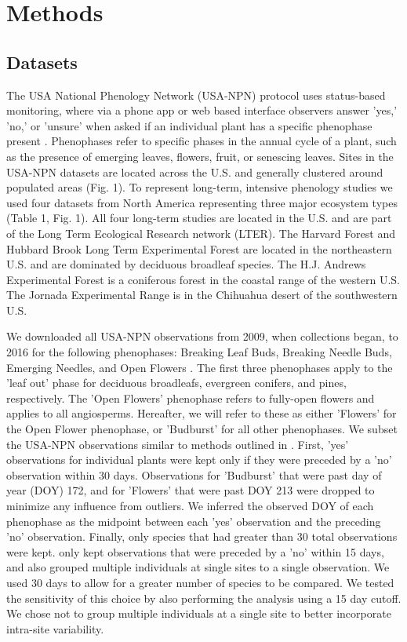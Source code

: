 \documentclass[fleqn,12pt,lineno]{article}
\begin{document}
\section*{Methods}

\subsection*{Datasets}

The USA National Phenology Network (USA-NPN) protocol uses status-based monitoring, where via a phone app or web based interface observers answer 'yes,' 'no,' or 'unsure' when asked if an individual plant has a specific phenophase present \citep{denny2014}. Phenophases refer to specific phases in the annual cycle of a plant, such as the presence of emerging leaves, flowers, fruit, or senescing leaves. Sites in the USA-NPN datasets are located across the U.S. and generally clustered around populated areas (Fig. 1). To represent long-term, intensive phenology studies we used four datasets from North America representing three major ecosystem types (Table 1, Fig. 1). All four long-term studies are located in the U.S. and are part of the Long Term Ecological Research network (LTER). The Harvard Forest and Hubbard Brook Long Term Experimental Forest are located in the northeastern U.S. and are dominated by deciduous broadleaf species. The H.J. Andrews Experimental Forest is a coniferous forest in the coastal range of the western U.S. The Jornada Experimental Range is in the Chihuahua desert of the southwestern U.S. 

We downloaded all USA-NPN observations from 2009, when collections began, to 2016 for the following phenophases: Breaking Leaf Buds, Breaking Needle Buds, Emerging Needles, and Open Flowers \citep{npndata}. The first three phenophases apply to the 'leaf out' phase for deciduous broadleafs, evergreen conifers, and pines, respectively. The 'Open Flowers' phenophase refers to fully-open flowers and applies to all angiosperms. Hereafter, we will refer to these as either 'Flowers' for the Open Flower phenophase, or 'Budburst' for all other phenophases. We subset the USA-NPN observations similar to methods outlined in \cite{crimmins2017}. First, 'yes' observations for individual plants were kept only if they were preceded by a 'no' observation within 30 days. Observations for 'Budburst' that were past day of year (DOY) 172, and for 'Flowers' that were past DOY 213 were dropped to minimize any influence from outliers. We inferred the observed DOY of each phenophase as the midpoint between each 'yes' observation and the preceding 'no' observation. Finally, only species that had greater than 30 total observations were kept. \cite{crimmins2017} only kept observations that were preceded by a 'no' within 15 days, and also grouped multiple individuals at single sites to a single observation. We used 30 days to allow for a greater number of species to be compared. We tested the sensitivity of this choice by also performing the analysis using a 15 day cutoff. We chose not to group multiple individuals at a single site to better incorporate intra-site variability.
\end{document}
